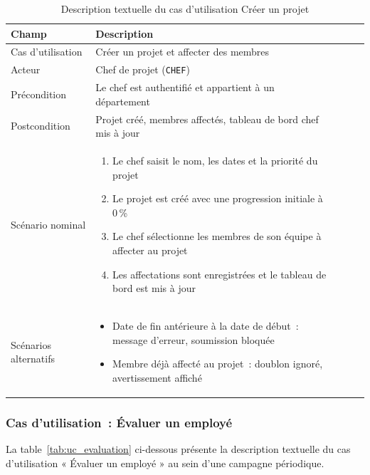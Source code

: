 \begin{table}[H]
\centering
\caption{Description textuelle du cas d’utilisation Créer un projet}
\label{tab:uc_projet}
\begin{tabularx}{\textwidth}{VlVLV}
\hline
\textbf{Champ} & \textbf{Description} \\
\hline
Cas d’utilisation & Créer un projet et affecter des membres \\
\hline
Acteur & Chef de projet (\texttt{CHEF}) \\
\hline
Précondition & Le chef est authentifié et appartient à un département \\
\hline
Postcondition & Projet créé, membres affectés, tableau de bord chef mis à jour \\
\hline
Scénario nominal &
\begin{enumerate}[leftmargin=*,nosep]
  \item Le chef saisit le nom, les dates et la priorité du projet
  \item Le projet est créé avec une progression initiale à 0\,\%
  \item Le chef sélectionne les membres de son équipe à affecter au projet
  \item Les affectations sont enregistrées et le tableau de bord est mis à jour
\end{enumerate} \\
\hline
Scénarios alternatifs &
\begin{itemize}[leftmargin=*,nosep]
  \item Date de fin antérieure à la date de début~: message d’erreur, soumission bloquée
  \item Membre déjà affecté au projet~: doublon ignoré, avertissement affiché
\end{itemize} \\
\hline
\end{tabularx}
\end{table}

\subsubsection*{Cas d'utilisation~: Évaluer un employé}

La table~\ref{tab:uc_evaluation} ci-dessous présente la description textuelle du
cas d'utilisation « Évaluer un employé » au sein d'une campagne périodique.

